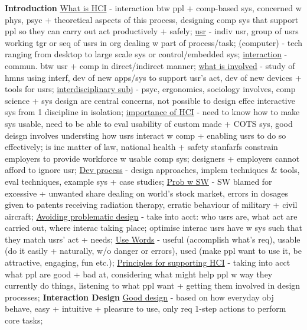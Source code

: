 \documentclass[a4paper]{article}
\begin{document}
    \begin{multicols}{3}
        \tiny
        \noindent \textbf{Introduction} \underline{What is HCI} - interaction btw ppl + comp-based sys, concerned w phys, psyc + theoretical aspects of this process, designing comp sys that support ppl so
        they can carry out act productively + safely;
        \underline{usr} - indiv usr, group of usrs working tgr or seq of usrs in org dealing w part of process/task;
        \underline(computer) - tech ranging from desktop to large scale sys or control/embedded sys;
        \underline{interaction} - commun. btw usr + comp in direct/indirect manner;
        \underline{what is involved} - study of hmns using interf, dev of new apps/sys to support usr's act, dev of new devices + tools for usrs; 
        \underline{interdisciplinary subj} - psyc, ergonomics, sociology involves, comp science + sys design are central concerns, not possible to design effec interactive sys from 1 discipline in isolation;
        \underline{importance of HCI} - need to know how to make sys usable, need to be able to eval usability of custom made + COTS sys, good deisgn involves understing how
        usrs interact w comp + enabling usrs to do so effectively; is inc matter of law, national health + safety stanfarfs constrain employers to provide workforce w usable comp sys;
        designers + employers cannot afford to ignore usr;
        \underline{Dev process} - design approaches, implem techniques \& tools, eval techniques, example sys + case studies;
        \underline{Prob w SW} - SW blamed for excessive + unwanted share dealing on world's stock market, errors in dosages given to patents receiving radiation therapy, erratic behaviour of military + civil aircraft;
        \underline{Avoiding problematic design} - take into acct: who usrs are, what act are carried out, where interac taking place; optimise interac usrs have w sys such that they match usrs' act + needs;
        \underline{Use Words} - useful (accomplish what's req), usable (do it easily + naturally, w/o danger or errors), used (make ppl want to use it, be attractive, engaging, fun etc.);
        \underline{Principles for supporting HCI} - taking into acct what ppl are good + bad at, considering what might help ppl w way they currently do things,
        listening to what ppl want + getting them involved in design processes; \newline \textbf{Interaction Design} \newline
        \underline{Good design} - based on how everyday obj behave, easy + intuitive + pleasure to use, only req 1-step actions to perform core tasks;

\end{multicols}
\end{document}
